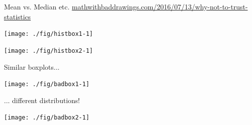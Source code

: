 \documentclass[xcolor=table,       handout,    xcolor=dvipsnames]{beamer}\usepackage[]{graphicx}\usepackage[]{color}
\newenvironment{knitrout}{}{} %
\newcounter{exercisecount}
\begin{document}



\begin{frame}[fragile]{Mean vs. Median etc.}
\href{https://mathwithbaddrawings.com/2016/07/13/why-not-to-trust-statistics/}{mathwithbaddrawings.com/2016/07/13/why-not-to-trust-statistics}
\begin{knitrout}
\color{fgcolor}

{\centering \texttt{[image: ./fig/histbox1-1]} 

}



\end{knitrout}
\pause
\begin{knitrout}
\color{fgcolor}

{\centering \texttt{[image: ./fig/histbox2-1]} 

}



\end{knitrout}
\end{frame}


\begin{frame}[fragile]{Similar boxplots...}
\begin{knitrout}
\color{fgcolor}

{\centering \texttt{[image: ./fig/badbox1-1]} 

}



\end{knitrout}
\end{frame}


\begin{frame}[fragile]{... different distributions!}
\begin{knitrout}
\color{fgcolor}

{\centering \texttt{[image: ./fig/badbox2-1]} 

}



\end{knitrout}
\end{frame}
\end{document}

